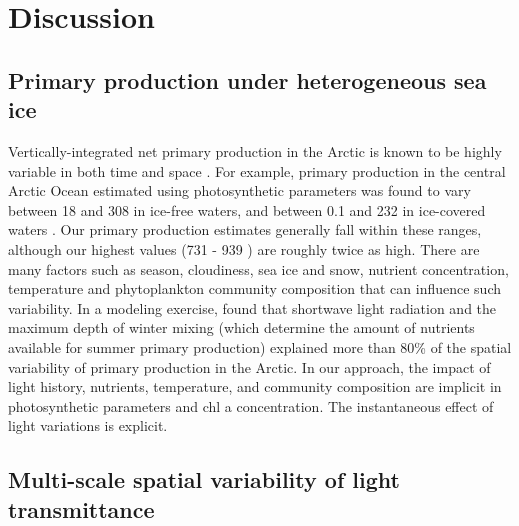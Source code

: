 \section{Discussion}

\subsection{Primary production under heterogeneous sea ice}

Vertically-integrated net primary production in the Arctic is known to be highly variable in both time and space \citep{Matrai2013, Hill2018a}. For example, primary production in the central Arctic Ocean estimated using photosynthetic parameters was found to vary between 18 and 308 \dailypp{} in ice-free waters, and between 0.1 and 232 \dailypp{} in ice-covered waters \citep{Fernandez-Mendez2015}. Our primary production estimates generally fall within these ranges, although our highest values (731 - 939 \dailypp{}) are roughly twice as high. There are many factors such as season, cloudiness, sea ice and snow, nutrient concentration, temperature and phytoplankton community composition that can influence such variability. In a modeling exercise, \citet{Popova2010} found that shortwave light radiation and the maximum depth of winter mixing (which determine the amount of nutrients available for summer primary production) explained more than 80\% of the spatial variability of primary production in the Arctic. In our approach, the impact of light history, nutrients, temperature, and community composition are implicit in photosynthetic parameters and chl a concentration. The instantaneous effect of light variations is explicit. 

\subsection{Multi-scale spatial variability of light transmittance}

